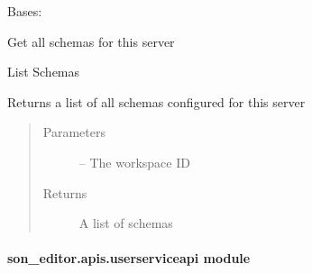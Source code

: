 \documentclass[letterpaper,10pt,english]{sphinxmanual}
\begin{document}
\begin{fulllineitems}
\label{_source/son_editor.apis:son_editor.apis.schemaapi.Schemas}
Bases: 

Get all schemas for this server

\begin{fulllineitems}
\label{_source/son_editor.apis:son_editor.apis.schemaapi.Schemas.get}
List Schemas

Returns a list of all schemas configured for this server
\begin{quote}\begin{description}
\item[{Parameters}] \leavevmode
{} -- The workspace ID

\item[{Returns}] \leavevmode
A list of schemas

\end{description}\end{quote}

\end{fulllineitems}


\begin{fulllineitems}
\label{_source/son_editor.apis:son_editor.apis.schemaapi.Schemas.methods}
\end{fulllineitems}


\end{fulllineitems}



\paragraph{son\_editor.apis.userserviceapi module}
\label{_source/son_editor.apis:son-editor-apis-userserviceapi-module}\label{_source/son_editor.apis:module-son_editor.apis.userserviceapi}
\end{document}
